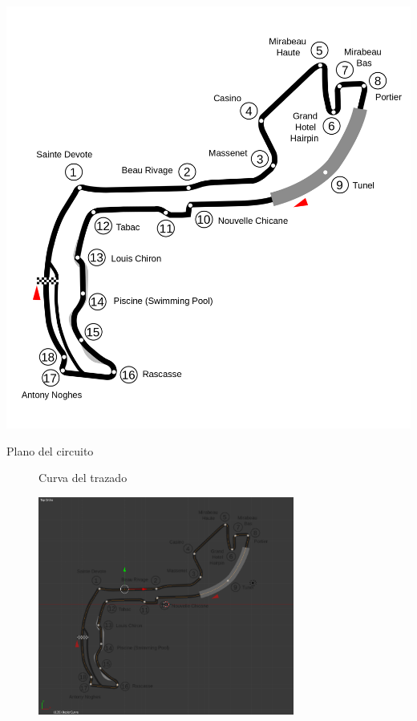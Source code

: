\documentclass[notes,slidesec,a4]{seminar}
\begin{document}
\begin{hslide}
\begin{minipage}{0.5\textwidth}
		\includegraphics[width=\textwidth]{CircuitoMonaco.png}
		\begin{center}
			Plano del circuito
		\end{center}
	\end{minipage}
\end{hslide}


\begin{hslide}
	\begin{center}
		\begin{figure}
			\begin{center}
				Curva del trazado
			\end{center}
			\includegraphics[width=0.75\textwidth]{MonacoTrazado.png}
		\end{figure}
	\end{center}
\end{hslide}
\end{document}
